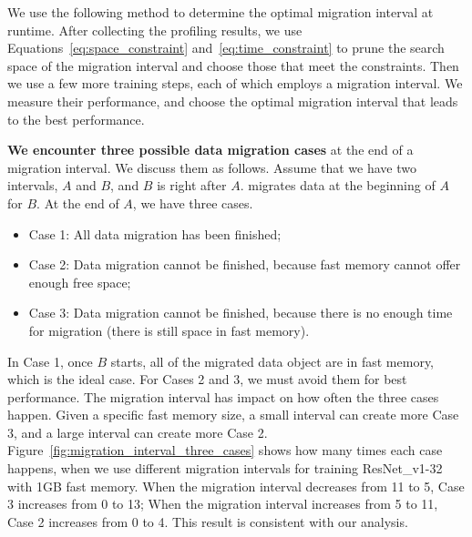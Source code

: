 We use the following method to determine the optimal migration interval at runtime. After collecting the profiling results, we use Equations~\ref{eq:space_constraint} and~\ref{eq:time_constraint} to prune the search space of the migration interval and choose those that meet the constraints. Then we use a few more training steps, each of which employs a migration interval. We measure their performance, and choose the optimal migration interval that leads to the best performance. 


\textbf{We encounter three possible data migration cases} at the end of a migration interval. We discuss them as follows. Assume that we have two intervals, $A$ and $B$, and $B$ is right after $A$. \name migrates data at the beginning of $A$ for $B$. At the end of $A$, we have three cases. %
\begin{itemize}[leftmargin=*]
    \item Case 1: All data migration has been finished;
    \item Case 2: Data migration cannot be finished, because fast memory cannot offer enough free space;
    \item Case 3: Data migration cannot be finished, because there is no enough time for migration (there is still space in fast memory).
\end{itemize}

In Case 1, once $B$ starts, all of the migrated data object are in fast memory, which is the ideal case. For Cases 2 and 3, we must avoid them for best performance. %
The migration interval has impact on how often the three cases happen. Given a specific fast memory size, a small interval can create more Case 3, and a large interval can create more Case 2. Figure~\ref{fig:migration_interval_three_cases} shows how many times each case happens, when we use different migration intervals for training ResNet\_v1-32 with 1GB fast memory. When the migration interval decreases from 11 to 5, Case 3 increases from 0 to 13; When the migration interval increases from 5 to 11, Case 2 increases from 0 to 4. This result is consistent with our analysis.





